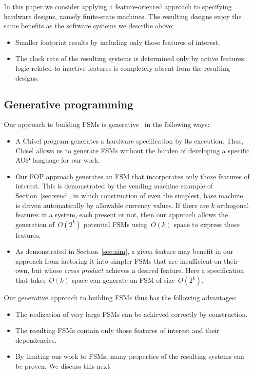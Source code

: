 \documentclass[sigplan,anonymous,review]{acmart}
\begin{document}
In this paper we consider applying a feature-oriented approach to specifying hardware designs, namely finite-state machines.
The resulting designs enjoy the same benefits as the software systems we describe above:
\begin{itemize}
    \item Smaller footprint results by including only those features of interest.
    \item The clock rate of the resulting systems is determined only by active features:  logic related to inactive features is completely absent from the resulting designs.
\end{itemize}

\subsection{Generative programming}\label{sec:priorgen}
Our approach to building FSMs is generative~\cite{10.1007/11527800_24} in the following ways:
\begin{itemize}
    \item A Chisel program generates a hardware specification by its execution.  Thus, Chisel allows us to generate FSMs without the burden of developing a specific AOP language for our work.
    \item Our FOP approach generates an FSM that incorporates only those features of interest.  This is demonstrated by the vending machine example of Section~\ref{sec:vend}, in which construction of even the simplest, base machine is driven automatically by allowable currency values.  If there are $k$ orthogonal features in a system, each present or not, then our approach allows the generation of~$O(2^{k})$ potential FSMs using~$O(k)$ space to express those features.
    \item As demonstrated in Section~\ref{sec:nim}, a given feature may benefit in our approach from factoring it into simpler FSMs that are insufficient on their own, but whose \emph{cross product} achieves a desired feature.  Here a specification that takes~$O(k)$ space can generate an FSM of size~$O(2^{k})$.
\end{itemize}
Our generative approach to building FSMs thus has the following advantages:
\begin{itemize}
    \item The realization of very large FSMs can be achieved correctly by construction.
    \item The resulting FSMs contain only those features of interest and their dependencies.
    \item By limiting our work to FSMs, many properties of the resulting systems can be proven.  We discuss this next.
\end{itemize}
  
\end{document}
